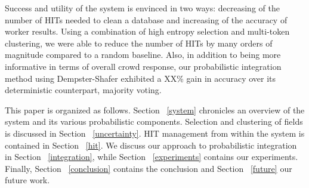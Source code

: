 Success and utility of the system is envinced in two ways: decreasing of the number of HITs needed to clean a database and increasing of the accuracy of worker results.  Using a combination of high entropy selection and multi-token clustering, we were able to reduce the number of HITs by many orders of magnitude compared to a random baseline.  Also, in addition to being more informative in terms of overall crowd response, our probabilistic integration method using Dempster-Shafer exhibited a XX\% gain in accuracy over its deterministic counterpart, majority voting. 

This paper is organized as follows.  Section ~\ref{system} chronicles an overview of the system and its various probabilistic components.  Selection and clustering of fields is discussed in Section ~\ref{uncertainty}.  HIT management from within the system is contained in Section ~\ref{hit}.  We discuss our approach to probabilistic integration in Section ~\ref{integration}, while Section ~\ref{experiments} contains our experiments.  Finally, Section ~\ref{conclusion} contains the conclusion and Section ~\ref{future} our future work.  


